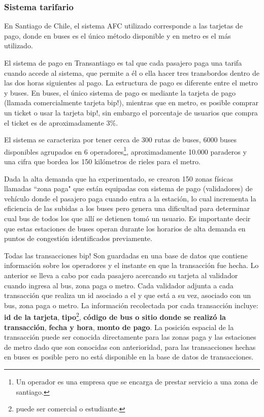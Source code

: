 \documentclass[12pt]{article}
\begin{document}
	\subsubsection{Sistema tarifario}
En Santiago de Chile, el sistema AFC utilizado corresponde a las tarjetas de pago, donde en buses es el único método disponible y en metro es el más utilizado.

El sistema de pago en Transantiago es tal que cada pasajero paga una tarifa cuando accede al sistema, que permite a él o ella hacer tres transbordos dentro de las dos horas siguientes al pago. La estructura de pago es diferente entre el metro y buses. En buses, el único sistema de pago es mediante la tarjeta de pago (llamada comercialmente tarjeta bip!), mientras que en metro, es posible comprar un ticket o usar la tarjeta bip!, sin embargo el porcentaje de usuarios que compra el ticket es de aproximadamente 3\%.


El sistema se caracteriza por tener cerca de 300 rutas de buses, 6000 buses disponibles agrupados en 6 operadores\footnote{Un operador es una empresa que se encarga de prestar servicio a una zona de santiago.}, aproximadamente 10.000 paraderos y una cifra que bordea los 150 kilómetros de rieles para el metro. 

Dada la alta demanda que ha experimentado, se crearon 150 zonas físicas llamadas ``zona paga" que están equipadas con sistema de pago (validadores) de vehículo donde el pasajero paga cuando entra a la estación, lo cual incrementa la eficiencia de las subidas a los buses pero genera una dificultad para determinar cual bus de todos los que allí se detienen tomó un usuario. Es importante decir que estas estaciones de buses operan durante los horarios de alta demanda en puntos de congestión identificados previamente.

Todas las transacciones bip! Son guardadas en una base de datos que contiene información sobre los operadores y el instante en que la transacción fue hecha. Lo anterior se lleva a cabo por cada pasajero acercando su tarjeta al validador cuando ingresa al bus, zona paga o metro. Cada validador adjunta a cada transacción que realiza un id asociado a el y que está a su vez, asociado con un bus, zona paga o metro. La información recolectada por cada transacción incluye: \textbf{id de la tarjeta}, \textbf{tipo}\footnote{puede ser comercial o estudiante.},  \textbf{código de bus o sitio donde se realizó la transacción}, \textbf{fecha y hora}, \textbf{monto de pago}. La posición espacial de la transacción puede ser conocida directamente para las zonas paga y las estaciones de metro dado que son conocidas con anterioridad, para las transacciones hechas en buses es posible pero no está disponible en la base de datos de transacciones.
\end{document}
